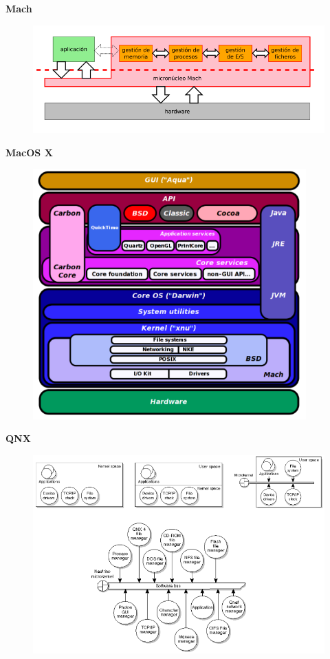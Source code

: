 \documentclass{article}
\begin{document}
\newpage

\textbf{Mach}
\begin{figure}[h]
\centering
\includegraphics[scale=1,width=\textwidth]{mach.png}
\end{figure}

\textbf{MacOS X}
\begin{figure}[h]
\centering
\includegraphics[scale=1, width=105mm]{MacOSX.png}
\end{figure}

\newpage

\textbf{QNX}
\begin{figure}[h]
\centering
\includegraphics[scale=1,width=\textwidth]{qnx.png}
\end{figure}
\end{document}
